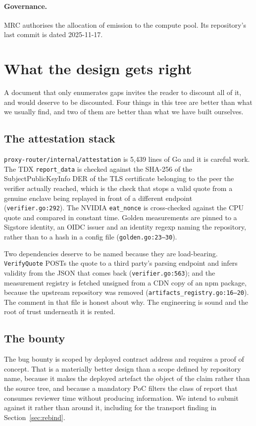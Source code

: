 \documentclass[11pt,a4paper]{article}
\newcommand{\code}[1]{\texttt{\small #1}}
\begin{document}
\paragraph{Governance.} MRC authorises the allocation of emission to the compute
pool. Its repository's last commit is dated 2025-11-17.

\section{What the design gets right}
\label{sec:good}

A document that only enumerates gaps invites the reader to discount all of it,
and would deserve to be discounted. Four things in this tree are better than
what we usually find, and two of them are better than what we have built
ourselves.

\subsection{The attestation stack}

\code{proxy-router/internal/attestation} is 5{,}439 lines of Go and it is
careful work. The TDX \code{report\_data} is checked against the SHA-256 of the
SubjectPublicKeyInfo DER of the TLS certificate belonging to the peer the
verifier actually reached, which is the check that stops a valid quote from a
genuine enclave being replayed in front of a different endpoint
(\code{verifier.go:292}). The NVIDIA \code{eat\_nonce} is cross-checked against
the CPU quote and compared in constant time. Golden measurements are pinned to a
Sigstore identity, an OIDC issuer and an identity regexp naming the repository,
rather than to a hash in a config file (\code{golden.go:23--30}).

Two dependencies deserve to be named because they are load-bearing.
\code{VerifyQuote} POSTs the quote to a third party's parsing endpoint and infers
validity from the JSON that comes back (\code{verifier.go:563}); and the
measurement registry is fetched unsigned from a CDN copy of an npm package,
because the upstream repository was removed
(\code{artifacts\_registry.go:16--20}). The comment in that file is honest about
why. The engineering is sound and the root of trust underneath it is rented.

\subsection{The bounty}

The bug bounty is scoped by deployed contract address and requires a proof of
concept. That is a materially better design than a scope defined by repository
name, because it makes the deployed artefact the object of the claim rather than
the source tree, and because a mandatory PoC filters the class of report that
consumes reviewer time without producing information. We intend to submit
against it rather than around it, including for the transport finding in
Section~\ref{sec:rebind}.
\end{document}
